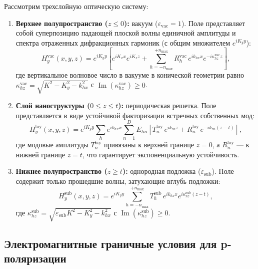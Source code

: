 \documentclass[a4paper,11pt]{article}
\begin{document}
Рассмотрим трехслойную оптическую систему:
\begin{enumerate}
    \item \textbf{Верхнее полупространство ($z \le 0$):} вакуум ($\varepsilon_{\text{vac}} = 1$). Поле представляет собой суперпозицию падающей плоской волны единичной амплитуды и спектра отраженных дифракционных гармоник (с общим множителем $e^{i K_y y}$):
    \begin{equation}
        H_y^{\text{vac}}(x, y, z) = e^{i K_y y} \left[ e^{i K_x x} e^{i K_z z} + \sum_{h=-n_{\max}}^{+n_{\max}} R_h^{\text{vac}} \, e^{i k_{hx} x} e^{-i \kappa_{hz}^{\text{vac}} z} \right],
        \label{eq:Hy_vac}
    \end{equation}
    где вертикальное волновое число в вакууме в конической геометрии равно $\kappa_{hz}^{\text{vac}} = \sqrt{K^2 - K_y^2 - k_{hx}^2}$ с $\operatorname{Im}(\kappa_{hz}^{\text{vac}}) \ge 0$.
    \item \textbf{Слой наноструктуры ($0 \le z \le t$):} периодическая решетка. Поле представляется в виде устойчивой факторизации встречных собственных мод:
    \begin{equation}
        H_y^{\text{lay}}(x, y, z) = e^{i K_y y} \sum_{h} e^{i k_{hx} x} \sum_{n=1}^D E_{hn} \left[ T_n^{\text{lay}} \, e^{i k_{zn} z} + R_n^{\text{lay}} \, e^{-i k_{zn}(z - t)} \right],
        \label{eq:Hy_lay}
    \end{equation}
    где модовые амплитуды $T_n^{\text{lay}}$ привязаны к верхней границе $z = 0$, а $R_n^{\text{lay}}$ — к нижней границе $z = t$, что гарантирует экспоненциальную устойчивость.
    \item \textbf{Нижнее полупространство ($z \ge t$):} однородная подложка ($\varepsilon_{\text{sub}}$). Поле содержит только прошедшие волны, затухающие вглубь подложки:
    \begin{equation}
        H_y^{\text{sub}}(x, y, z) = e^{i K_y y} \sum_{h=-n_{\max}}^{+n_{\max}} T_h^{\text{sub}} \, e^{i k_{hx} x} e^{i \kappa_{hz}^{\text{sub}} (z - t)},
        \label{eq:Hy_sub}
    \end{equation}
    где $\kappa_{hz}^{\text{sub}} = \sqrt{\varepsilon_{\text{sub}} K^2 - K_y^2 - k_{hx}^2}$ с $\operatorname{Im}(\kappa_{hz}^{\text{sub}}) \ge 0$.
\end{enumerate}

\subsection{Электромагнитные граничные условия для p-поляризации}
\end{document}
